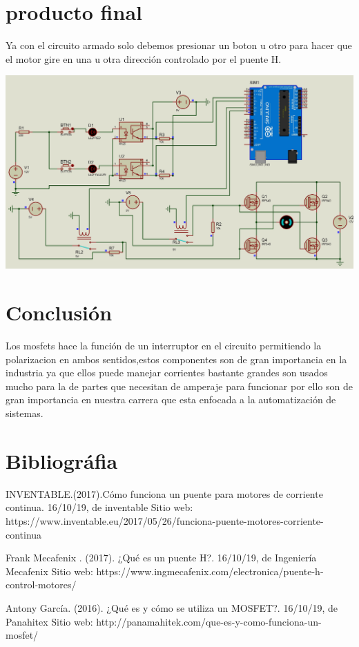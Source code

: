 \documentclass[12pt,a4paper]{article}
\begin{document}
\newpage
\begin{flushleft}
\section{producto final}
Ya con el circuito armado solo debemos presionar un boton u otro para hacer que el motor gire en una u otra dirección controlado por el puente H.\linebreak

\includegraphics[scale=0.2]{imagenes/simu0.JPG}\linebreak

\section{Conclusión}
Los mosfets hace la función de un interruptor en el circuito permitiendo la polarizacion en ambos sentidos,estos componentes son de gran importancia en la industria ya que ellos puede manejar corrientes bastante grandes son usados mucho para la  de partes que necesitan  de amperaje para funcionar por ello son de gran importancia en nuestra carrera que esta enfocada a la automatización de sistemas.

\section{Bibliográfia}
INVENTABLE.(2017).Cómo funciona un puente para motores de corriente continua. 16/10/19, de inventable Sitio web: https://www.inventable.eu/2017/05/26/funciona-puente-motores-corriente-continua\linebreak

Frank Mecafenix . (2017). ¿Qué es un puente H?. 16/10/19, de Ingeniería Mecafenix Sitio web: https://www.ingmecafenix.com/electronica/puente-h-control-motores/\linebreak

Antony García. (2016). ¿Qué es y cómo se utiliza un MOSFET?. 16/10/19, de Panahitex Sitio web: http://panamahitek.com/que-es-y-como-funciona-un-mosfet/\linebreak

\end{flushleft}
\end{document}
